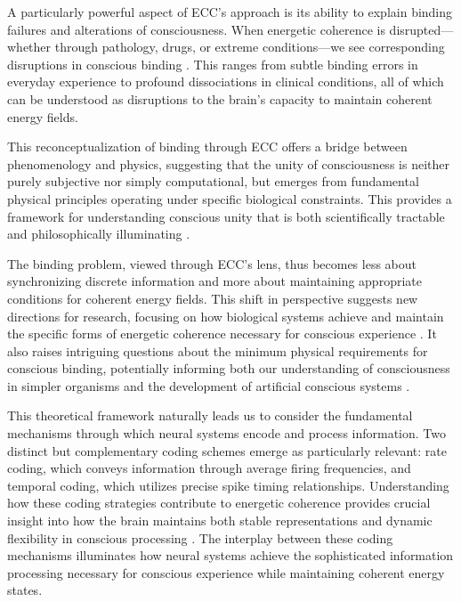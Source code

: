 A particularly powerful aspect of ECC's approach is its ability to explain binding failures and alterations of consciousness. When energetic coherence is disrupted—whether through pathology, drugs, or extreme conditions—we see corresponding disruptions in conscious binding \cite{wang2010neurophysiological}. This ranges from subtle binding errors in everyday experience to profound dissociations in clinical conditions, all of which can be understood as disruptions to the brain's capacity to maintain coherent energy fields.

This reconceptualization of binding through ECC offers a bridge between phenomenology and physics, suggesting that the unity of consciousness is neither purely subjective nor simply computational, but emerges from fundamental physical principles operating under specific biological constraints. This provides a framework for understanding conscious unity that is both scientifically tractable and philosophically illuminating \cite{roskies1999binding}.

The binding problem, viewed through ECC's lens, thus becomes less about synchronizing discrete information and more about maintaining appropriate conditions for coherent energy fields. This shift in perspective suggests new directions for research, focusing on how biological systems achieve and maintain the specific forms of energetic coherence necessary for conscious experience \cite{kumar2010spiking}. It also raises intriguing questions about the minimum physical requirements for conscious binding, potentially informing both our understanding of consciousness in simpler organisms and the development of artificial conscious systems \cite{buzsaki2004neuronal}.

This theoretical framework naturally leads us to consider the fundamental mechanisms through which neural systems encode and process information. Two distinct but complementary coding schemes emerge as particularly relevant: rate coding, which conveys information through average firing frequencies, and temporal coding, which utilizes precise spike timing relationships. Understanding how these coding strategies contribute to energetic coherence provides crucial insight into how the brain maintains both stable representations and dynamic flexibility in conscious processing \cite{panzeri2010sensory, lisman2013theta}. The interplay between these coding mechanisms illuminates how neural systems achieve the sophisticated information processing necessary for conscious experience while maintaining coherent energy states.

